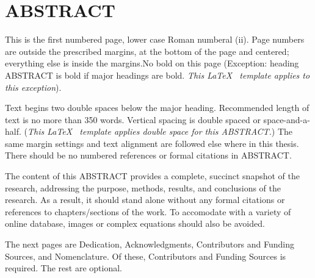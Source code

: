 %
%
%
%

\chapter*{ABSTRACT}

\pagestyle{plain} %
\setcounter{page}{2}

\indent This is the first numbered page, lower case Roman numberal (ii). Page numbers are outside the prescribed margins, at the bottom of the page and centered; everything else is inside the margins.No bold on this page (Exception: heading ABSTRACT is bold if major headings are bold. \emph{This \LaTeX ~ template applies to this exception}).

Text begins two double spaces below the major heading. Recommended length of text is no more than 350 words. Vertical spacing is double spaced or space-and-a-half. (\emph{This \LaTeX ~ template applies double space for this ABSTRACT.}) The same margin settings and text alignment are followed else where in this thesis. There should be no numbered references or formal citations in ABSTRACT.

The content of this ABSTRACT provides a complete, succinct snapshot of the research, addressing the purpose, methods, results, and conclusions of the research. As a result, it should stand alone without any formal citations or references to chapters/sections of the work. To accomodate with a variety of online database, images or complex equations should also be avoided.

The next pages are Dedication, Acknowledgments, Contributors and Funding Sources, and Nomenclature. Of these, Contributors and Funding Sources is required. The rest are optional.


 

\pagebreak{}
